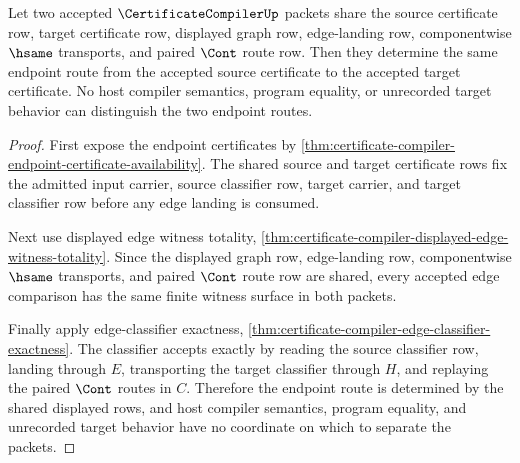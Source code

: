 \begin{theorem}
\label{thm:certificate-compiler-endpoint-route-determinacy}
Let two accepted $\CertificateCompilerUp$ packets share the source certificate row, target certificate row, displayed graph row, edge-landing row, componentwise $\hsame$ transports, and paired $\Cont$ route row. Then they determine the same endpoint route from the accepted source certificate to the accepted target certificate. No host compiler semantics, program equality, or unrecorded target behavior can distinguish the two endpoint routes.
\end{theorem}
\begin{proof}
First expose the endpoint certificates by \autoref{thm:certificate-compiler-endpoint-certificate-availability}. The shared source and target certificate rows fix the admitted input carrier, source classifier row, target carrier, and target classifier row before any edge landing is consumed.

Next use displayed edge witness totality, \autoref{thm:certificate-compiler-displayed-edge-witness-totality}. Since the displayed graph row, edge-landing row, componentwise $\hsame$ transports, and paired $\Cont$ route row are shared, every accepted edge comparison has the same finite witness surface in both packets.

Finally apply edge-classifier exactness, \autoref{thm:certificate-compiler-edge-classifier-exactness}. The classifier accepts exactly by reading the source classifier row, landing through $E$, transporting the target classifier through $H$, and replaying the paired $\Cont$ routes in $C$. Therefore the endpoint route is determined by the shared displayed rows, and host compiler semantics, program equality, and unrecorded target behavior have no coordinate on which to separate the packets.
\end{proof}

